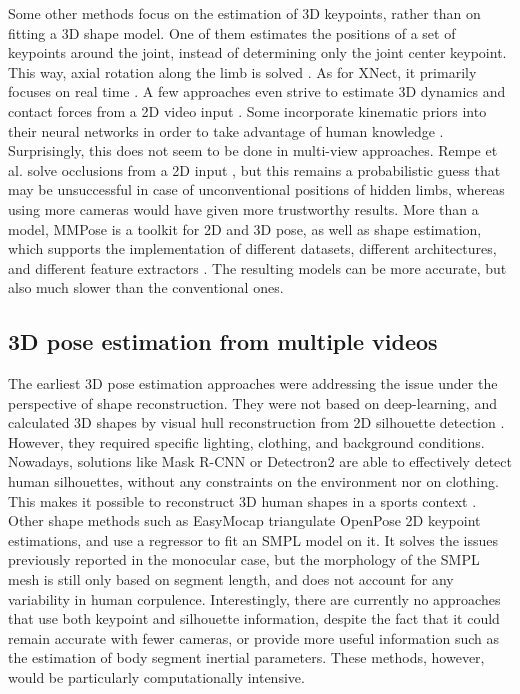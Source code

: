Some other methods focus on the estimation of 3D keypoints, rather than on fitting a 3D shape model. One of them estimates the positions of a set of keypoints around the joint, instead of determining only the joint center keypoint. This way, axial rotation along the limb is solved \cite{Fisch2020}. As for XNect, it primarily focuses on real time \cite{Mehta2020}. A few approaches even strive to estimate 3D dynamics and contact forces from a 2D video input \cite{Li2019,Rempe2021,Louis2022}. Some incorporate kinematic priors into their neural networks in order to take advantage of human knowledge \cite{Xu2020a}. Surprisingly, this does not seem to be done in multi-view approaches. Rempe et al. solve occlusions from a 2D input \cite{Rempe2020}, but this remains a probabilistic guess that may be unsuccessful in case of unconventional positions of hidden limbs, whereas using more cameras would have given more trustworthy results. More than a model, MMPose is a toolkit for 2D and 3D pose, as well as shape estimation, which supports the implementation of different datasets, different architectures, and different feature extractors \cite{MMPose2020}. The resulting models can be more accurate, but also much slower than the conventional ones.


\subsection{3D pose estimation from multiple videos}

The earliest 3D pose estimation approaches were addressing the issue under the perspective of shape reconstruction. They were not based on deep-learning, and calculated 3D shapes by visual hull reconstruction from 2D silhouette detection \cite{Cheung2003,Corazza2006}. However, they required specific lighting, clothing, and background conditions. Nowadays, solutions like Mask R-CNN \cite{He2017} or Detectron2 \cite{Wu2019} are able to effectively detect human silhouettes, without any constraints on the environment nor on clothing. This makes it possible to reconstruct 3D human shapes in a sports context \cite{Chen2019}. Other shape methods such as EasyMocap \cite{Easymocap2021} triangulate OpenPose 2D keypoint estimations, and use a regressor to fit an SMPL model on it. It solves the issues previously reported in the monocular case, but the morphology of the SMPL mesh is still only based on segment length, and does not account for any variability in human corpulence. Interestingly, there are currently no approaches that use both keypoint and silhouette information, despite the fact that it could remain accurate with fewer cameras, or provide more useful information such as the estimation of body segment inertial parameters. These methods, however, would be particularly computationally intensive.

